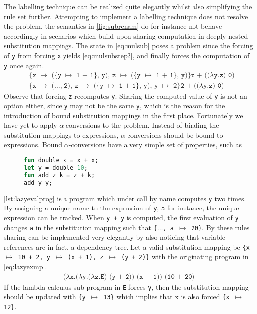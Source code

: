 \documentclass[11pt,oneside,a4paper]{report}
\begin{document}
The labelling technique can be realized quite elegantly whilst also simplifying the rule set further.
Attempting to implement a labelling technique does not resolve the problem, the semantics in \autoref{fig:subrenam} do for instance not behave accordingly in scenarios which build upon sharing computation in deeply nested substitution mappings.
The state in \autoref{eq:mulsub} poses a problem since the forcing of \texttt{y} from forcing \texttt{x} yields \autoref{eq:mulsubstep2}, and finally forces the computation of \texttt{y} once again.
\begin{align}
  &\texttt{\{x $\mapsto$ (\{y $\mapsto$ 1 + 1\}, y), z $\mapsto$ (\{y $\mapsto$ 1 + 1\}, y)\}x + (($\lambda$y.z) 0)} \label{eq:mulsub}\\
  &\texttt{\{x $\mapsto$ ($\dots$, 2), z $\mapsto$ (\{y $\mapsto$ 1 + 1\}, y), y $\mapsto$ 2\}2 + (($\lambda$y.z) 0)} \label{eq:mulsubstep2}
\end{align}
Observe that forcing \texttt{z} recomputes \texttt{y}.
Sharing the computed value of \texttt{y} is not an option either, since \texttt{y} may not be the same \texttt{y}, which is the reason for the introduction of bound substitution mappings in the first place.
Fortunately we have yet to apply $\alpha$-conversions to the problem.
Instead of binding the substitution mappings to expressions, $\alpha$-conversions should be bound to expressions.
Bound $\alpha$-conversions have a very simple set of properties, such as 

\begin{figure}
\begin{lstlisting}[language=ML,caption={Program which benifits from lazy evaluation},label={lst:lazyevalprog},mathescape=true]
fun double x = x + x;
let y = double 10;
fun add z k = z + k;
add y y;
\end{lstlisting}
\end{figure}
\autoref{lst:lazyevalprog} is a program which under call by name computes \texttt{y} two times.
By assigning a unique name to the expression of \texttt{y}, \texttt{a} for instance, the unique expression can be tracked.
When \texttt{y + y} is computed, the first evaluation of \texttt{y} changes \texttt{a} in the substitution mapping such that \texttt{\{$\dots$, a $\mapsto$ 20\}}.
By these rules sharing can be implemented very elegantly by also noticing that variable references are in fact, a dependency tree.
Let a valid substitution mapping be \texttt{\{x $\mapsto$ 10 + 2, y $\mapsto$ (x + 1), z $\mapsto$ (y + 2)\}} with the originating program in \autoref{eq:lazyexmp}.
\begin{align}
  \texttt{($\lambda$x.($\lambda$y.($\lambda$z.E) (y + 2)) (x + 1)) (10 + 20)} \label{eq:lazyexmp}
\end{align}
If the lambda calculus sub-program in \texttt{E} forces \texttt{y}, then the substitution mapping should be updated with \texttt{\{y $\mapsto$ 13\}} which implies that x is also forced \texttt{\{x $\mapsto$ 12\}}.
\end{document}
